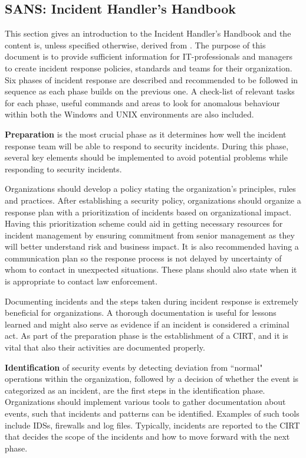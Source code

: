 \subsection{SANS: Incident Handler's Handbook}
This section gives an introduction to the Incident Handler's Handbook and the content is, unless specified otherwise, derived from \cite{SANShandbook}. The purpose of this document is to provide sufficient information for IT-professionals and managers to create incident response policies, standards and teams for their organization. Six phases of incident response are described and recommended to be followed in sequence as each phase builds on the previous one. A check-list of relevant tasks for each phase, useful commands and areas to look for anomalous behaviour within both the Windows and UNIX environments are also included.

\textbf{Preparation} is the most crucial phase as it determines how well the incident response team will be able to respond to security incidents. During this phase, several key elements should be implemented to avoid potential problems while responding to security incidents.

Organizations should develop a policy stating the organization's principles, rules and practices. After establishing a security policy, organizations should organize a response plan with a prioritization of incidents based on organizational impact. Having this prioritization scheme could aid in getting necessary resources for incident management by ensuring commitment from senior management as they will better understand risk and business impact. It is also recommended having a communication plan so the response process is not delayed by uncertainty of whom to contact in unexpected situations. These plans should also state when it is appropriate to contact law enforcement.

Documenting incidents and the steps taken during incident response is extremely beneficial for organizations. A thorough documentation is useful for lessons learned and might also serve as evidence if an incident is considered a criminal act. As part of the preparation phase is the establishment of a \ac{CIRT}, and it is vital that also their activities are documented properly. 

\textbf{Identification} of security events by detecting deviation from ``normal" operations within the organization, followed by a decision of whether the event is categorized as an incident, are the first steps in the identification phase. Organizations should implement various tools to gather documentation about events, such that incidents and patterns can be identified. Examples of such tools include \acp{IDS}, firewalls and log files. Typically, incidents are reported to the \ac{CIRT} that decides the scope of the incidents and how to move forward with the next phase.

